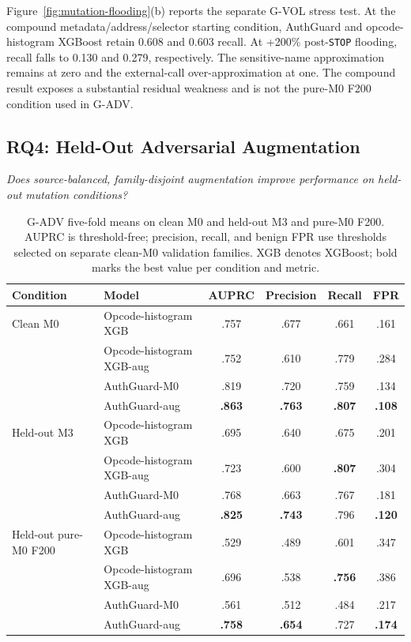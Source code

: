 \documentclass[conference]{IEEEtran}
\begin{document}
Figure~\ref{fig:mutation-flooding}(b) reports the separate G-VOL stress test. At the compound metadata/address/selector starting condition, AuthGuard and opcode-histogram XGBoost retain 0.608 and 0.603 recall. At +200\% post-\texttt{STOP} flooding, recall falls to 0.130 and 0.279, respectively. The sensitive-name approximation remains at zero and the external-call over-approximation at one. The compound result exposes a substantial residual weakness and is not the pure-M0 F200 condition used in G-ADV.

\subsection{RQ4: Held-Out Adversarial Augmentation}

\emph{Does source-balanced, family-disjoint augmentation improve performance on held-out mutation conditions?}

\begin{table}[t]
  \centering
  \caption{G-ADV five-fold means on clean M0 and held-out M3 and pure-M0 F200. AUPRC is threshold-free; precision, recall, and benign FPR use thresholds selected on separate clean-M0 validation families. XGB denotes XGBoost; bold marks the best value per condition and metric.}
  \label{tab:gadv-results}
  \small
  \setlength{\tabcolsep}{6pt}
  \begin{tabular}{@{}llcccc@{}}
    \toprule
    Condition & Model & AUPRC & Precision & Recall & FPR \\
    \midrule
    Clean M0 & Opcode-histogram XGB & .757 & .677 & .661 & .161 \\
             & Opcode-histogram XGB-aug & .752 & .610 & .779 & .284 \\
             & AuthGuard-M0 & .819 & .720 & .759 & .134 \\
             & AuthGuard-aug & \textbf{.863} & \textbf{.763} & \textbf{.807} & \textbf{.108} \\
    \midrule
    Held-out M3 & Opcode-histogram XGB & .695 & .640 & .675 & .201 \\
                & Opcode-histogram XGB-aug & .723 & .600 & \textbf{.807} & .304 \\
                & AuthGuard-M0 & .768 & .663 & .767 & .181 \\
                & AuthGuard-aug & \textbf{.825} & \textbf{.743} & .796 & \textbf{.120} \\
    \midrule
    Held-out pure-M0 F200 & Opcode-histogram XGB & .529 & .489 & .601 & .347 \\
                          & Opcode-histogram XGB-aug & .696 & .538 & \textbf{.756} & .386 \\
                          & AuthGuard-M0 & .561 & .512 & .484 & .217 \\
                          & AuthGuard-aug & \textbf{.758} & \textbf{.654} & .727 & \textbf{.174} \\
    \bottomrule
  \end{tabular}
\end{table}
\end{document}

